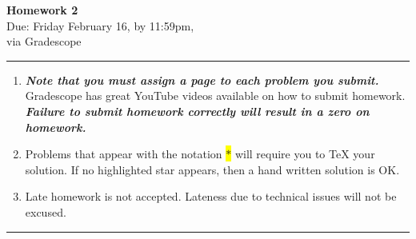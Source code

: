 \documentclass[12pt]{article}
\newif\ifshow
\begin{document}
\begin{center}
\ifshow
  \textbf{\Large Homework 2 Solution}\\
\else
  \textbf{\Large Homework 2}\\
\fi
Due: Friday February 16, by 11:59pm,\\via Gradescope\\
\end{center}

\hrule

\vspace{0.2cm}

\begin{enumerate}[$\bullet$]
\item  {\textbf{\textit{Note that you must assign a page to each problem you submit.}}}   Gradescope has great YouTube videos available on how to submit homework.  \textit{\textbf{Failure to submit homework correctly will result in a zero on homework.}}
\item Problems that appear with the notation \colorbox{yellow}{$\ast$} will require you to TeX your solution.  If no highlighted star appears, then a hand written solution is OK.  
\item Late homework is not accepted.  Lateness due to technical issues will not be excused.  
\end{enumerate}

\hrule

\vspace{0.5cm}
\end{document}
